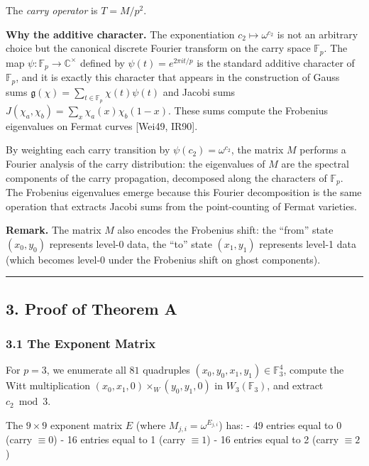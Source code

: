 \documentclass[
  11pt,
]{article}
\begin{document}
The \emph{carry operator} is \(T = M / p^2\).

\textbf{Why the additive character.} The exponentiation
\(c_2 \mapsto \omega^{c_2}\) is not an arbitrary choice but the canonical
discrete Fourier transform on the carry space \(\mathbb{F}_p\). The map
\(\psi: \mathbb{F}_p \to \mathbb{C}^\times\) defined by
\(\psi(t) = e^{2\pi i t/p}\) is the standard additive character of
\(\mathbb{F}_p\), and it is exactly this character that appears in the
construction of Gauss sums
\(\mathfrak{g}(\chi) = \sum_{t \in \mathbb{F}_p} \chi(t) \psi(t)\) and Jacobi
sums \(J(\chi_a, \chi_b) = \sum_x \chi_a(x) \chi_b(1-x)\). These sums compute
the Frobenius eigenvalues on Fermat curves {[}Wei49, IR90{]}.

By weighting each carry transition by \(\psi(c_2) = \omega^{c_2}\), the matrix
\(M\) performs a Fourier analysis of the carry distribution: the eigenvalues of
\(M\) are the spectral components of the carry propagation, decomposed along the
characters of \(\mathbb{F}_p\). The Frobenius eigenvalues emerge because this
Fourier decomposition is the same operation that extracts Jacobi sums from the
point-counting of Fermat varieties.

\textbf{Remark.} The matrix \(M\) also encodes the Frobenius shift: the ``from''
state \((x_0, y_0)\) represents level-0 data, the ``to'' state \((x_1, y_1)\)
represents level-1 data (which becomes level-0 under the Frobenius shift on
ghost components).

\begin{center}\rule{0.5\linewidth}{0.5pt}\end{center}

\newpage

\subsection{3. Proof of Theorem A}\label{proof-of-theorem-a}

\subsubsection{3.1 The Exponent Matrix}\label{the-exponent-matrix}

For \(p = 3\), we enumerate all \(81\) quadruples
\((x_0, y_0, x_1, y_1) \in \mathbb{F}_3^4\), compute the Witt multiplication
\((x_0, x_1, 0) \times_W (y_0, y_1, 0)\) in \(W_3(\mathbb{F}_3)\), and extract
\(c_2 \bmod 3\).

The \(9 \times 9\) exponent matrix \(E\) (where \(M_{j,i} = \omega^{E_{j,i}}\))
has: - 49 entries equal to 0 (carry \(\equiv 0\)) - 16 entries equal to 1 (carry
\(\equiv 1\)) - 16 entries equal to 2 (carry \(\equiv 2\))
\end{document}
